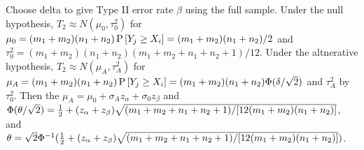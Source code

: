 \def\probof#1#2{\mathop{\hbox{P}}\left[#2\right]}\def\Ncdf{\Phi}\def\half{{{1}\over{2}}}
Choose delta to give Type II error rate $\beta$ using the full sample.
Under the null hypothesis,
$T_2\approx N(\mu_0,\tau_0^2)$ for $\mu_0=(m_1+m_2)(n_1+n_2)\probof{}{Y_j\geq X_i}=(m_1+m_2)(n_1+n_2)/2$ and $\tau_0^2=(m_1+m_2)(n_1+n_2)(m_1+m_2+n_1+n_2+1)/12$.
Under the altnerative hypothesis,
$T_2\approx N(\mu_A,\tau_A^2)$ for $\mu_A=(m_1+m_2)(n_1+n_2)\probof{}{Y_j\geq X_
i}=(m_1+m_2)(n_1+n_2)\Ncdf(\delta/\sqrt{2})$ and $\tau_A^2$ by $\tau_0^2$.
Then the $\mu_A=\mu_0+\sigma_A z_\alpha+\sigma_0 z_\beta$ and
$\Ncdf(\theta/\sqrt{2})=\half+(z_\alpha+z_\beta)\sqrt{(m_1+m_2+n_1+n_2+1)/[12(m_1+m_2)(n_1+n_2)]}$, and $\theta=\sqrt{2}\Ncdf^{-1}(\half+(z_\alpha+z_\beta)\sqrt{(m_1+m_2+n_1+n_2+1)/[12(m_1+m_2)(n_1+n_2)]})$.
